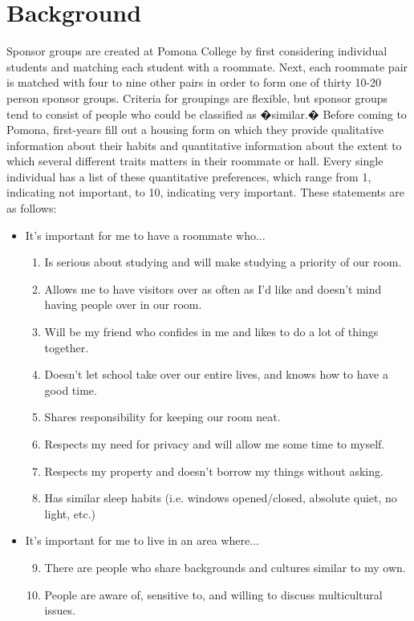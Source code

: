 \documentclass[letterpaper]{article}
\begin{document}
\section{Background}

Sponsor groups are created at Pomona College by first considering individual students and matching each student with a roommate. Next, each roommate pair is matched with four to nine other pairs in order to form one of thirty 10-20 person sponsor groups. Criteria for groupings are flexible, but sponsor groups tend to consist of people who could be classified as �similar.� Before coming to Pomona, first-years fill out a housing form on which they provide qualitative information about their habits and quantitative information about the extent to which several different traits matters in their roommate or hall. Every single individual has a list of these quantitative preferences, which range from 1, indicating not important, to 10, indicating very important. These statements are as follows:

\begin{itemize}
\item It's important for me to have a roommate who...
\begin{enumerate}
\item Is serious about studying and will make studying a priority of our room.
\item Allows me to have visitors over as often as I'd like and doesn't mind having people over in our room.
\item Will be my friend who confides in me and likes to do a lot of things together.
\item Doesn't let school take over our entire lives, and knows how to have a good time.
\item Shares responsibility for keeping our room neat.
\item Respects my need for privacy and will allow me some time to myself.
\item Respects my property and doesn't borrow my things without asking.
\item Has similar sleep habits (i.e. windows opened/closed, absolute quiet, no light, etc.)
\end{enumerate}
\item It's important for me to live in an area where...
\begin{enumerate}
\setcounter{enumi}{8}
\item There are people who share backgrounds and cultures similar to my own.
\item People are aware of, sensitive to, and willing to discuss multicultural issues.
\end{enumerate}
\end{itemize}
\end{document}
